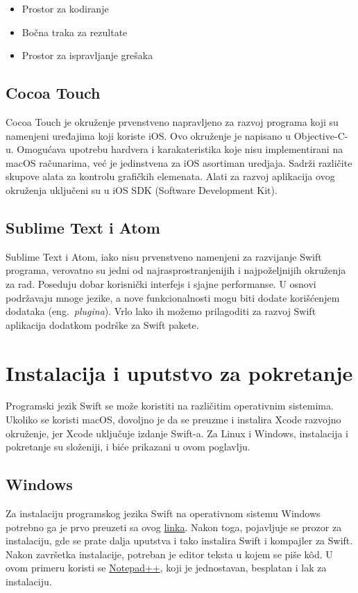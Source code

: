 \documentclass[a4paper]{article}
\begin{document}
\begin{itemize}
\item Prostor za kodiranje
\item Bočna traka za rezultate
\item Prostor za ispravljanje grešaka
\end{itemize}

\subsection{Cocoa Touch}
\label{subsec:podnaslovCocoaTouch}
Cocoa Touch je okruženje prvenstveno napravljeno za razvoj programa
koji su namenjeni uređajima koji koriste iOS. Ovo okruženje je napisano u Objective-C-u. Omogućava upotrebu hardvera i karakateristika koje nisu implementirani na macOS računarima, već je jedinstvena za iOS asortiman uredjaja. Sadrži različite skupove alata za kontrolu grafičkih elemenata. Alati za razvoj aplikacija ovog okruženja uključeni su u iOS SDK (Software Development Kit).

\subsection{Sublime Text i Atom}
\label{subsec:podnaslovAtom}
Sublime Text i Atom, iako nisu prvenstveno namenjeni za razvijanje Swift programa, verovatno su jedni od najrasprostranjenijih i najpoželjnijih okruženja za rad. Poseduju dobar korisnički interfejs i sjajne performanse. U osnovi podržavaju mnoge jezike, a nove funkcionalnosti mogu biti dodate korišćenjem dodataka (eng.~{\em plugina}). Vrlo lako ih možemo prilagoditi za razvoj Swift aplikacija dodatkom podrške za Swift pakete.

\section{Instalacija i uputstvo za pokretanje}	
\label{sec:sestiDeo}
Programski jezik Swift se može koristiti na različitim operativnim sistemima. Ukoliko se koristi macOS, dovoljno je da se preuzme i instalira Xcode razvojno okruženje, jer Xcode uključuje izdanje Swift-a. Za Linux i Windows, instalacija i pokretanje su složeniji, i biće prikazani u ovom poglavlju.

\subsection{Windows}
\label{subsec:podnaslovWindows}
Za instalaciju programskog jezika Swift na operativnom sistemu Windows potrebno ga je prvo preuzeti sa ovog \href{https://swiftforwindows.github.io}{linka}. Nakon toga, pojavljuje se prozor za instalaciju, gde se prate dalja uputstva i tako instalira Swift i kompajler za Swift. Nakon završetka instalacije, potreban je editor teksta u kojem se piše k\^{o}d. U ovom primeru koristi se \href{https://notepad-plus-plus.org/download/v7.6.4.html}{Notepad++}, koji je jednostavan, besplatan i lak za instalaciju.
\end{document}
